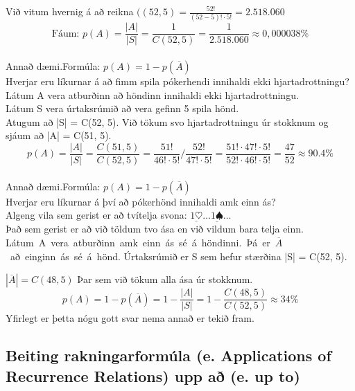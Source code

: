Við vitum hvernig á að reikna $((52, 5) = \frac{52!}{(52-5)! \cdot 5!} = 2.518.060$
\begin{equation*}
    \text{Fáum: } p(A) = \frac{ |A| }{ |S| } = \frac{1}{C(52,5)} = \frac{1}{2.518.060} \approx 0,000038\%
\end{equation*}\vspace*{1em}\\
Annað dæmi.\qquad Formúla: $p(A) = 1- p(\overline{A}) $\vspace*{0.3em}\\
Hverjar eru líkurnar á að fimm spila pókerhendi innihaldi ekki hjartadrottningu?\vspace*{0.3em}\\
Látum A vera atburðinn að höndinn innihaldi ekki hjartadrottningu.\\
Látum S vera úrtaksrúmið að vera gefinn 5 spila hönd.\\
Atugum að |S| = C(52, 5). Við tökum svo hjartadrottningu úr stokknum og sjáum að |A| = C(51, 5).
\begin{equation*}
    p(A) = \frac{ |A| }{ |S| } = \frac{C(51,5)}{C(52,5)} = \frac{51!}{46! \cdot 5!} / \frac{52!}{47! \cdot 5!} = \frac{51! \cdot 47! \cdot 5!}{52! \cdot 46! \cdot 5!} = \frac{47}{52} \approx 90.4\%
\end{equation*}\\
\newpage
\hspace*{-1.3em}Annað dæmi.\qquad Formúla: $p(A) = 1- p(\overline{A}) $\vspace*{0.3em}\\
Hverjar eru líkurnar á því að pókerhönd innihaldi amk einn ás?\vspace*{0.3em}\\
Algeng vila sem gerist er að tvítelja svona: $\underline{1\heartsuit} \ldots \underline{1\spadesuit } \ldots$\\
Það sem gerist er að við töldum tvo ása en við vildum bara telja einn.\vspace*{0.5em}\\
\hbox{Látum A vera atburðinn amk einn ás sé á höndinni. Þá er $\overline{A}$ að einginn ás sé á hönd.}
Úrtaksrúmið er S sem hefur stærðina |S| = C(52, 5).\vspace*{0.4em}

$|\overline{A}| = C(48,5)$ Þar sem við tökum alla ása úr stokknum.
\begin{equation*}
    p(A)= 1- p(\overline{A}) = 1 - \frac{ |A| }{ |S| } = 1 - \frac{C(48,5)}{C(52,5)} \approx 34\%
\end{equation*}
Yfirlegt er þetta nógu gott svar nema annað er tekið fram.\\



 
\newpage
\setcounter{section}{8}
\setcounter{subsection}{0}
\subsection{Beiting rakningarformúla  (e. Applications of Recurrence Relations) upp að (e. up to)}

\newpage